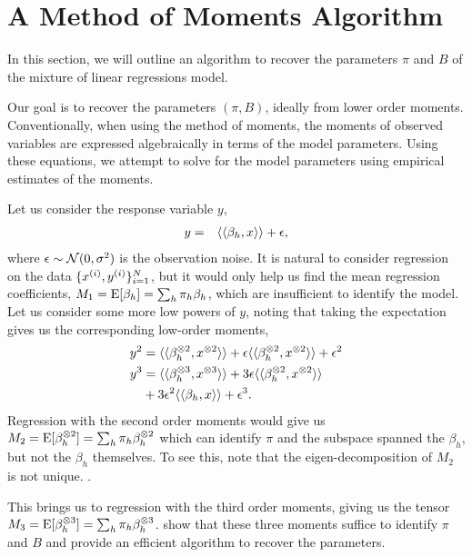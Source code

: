\section{A Method of Moments Algorithm}
\label{sec:algo}

In this section, we will outline an algorithm to recover the parameters
$\pi$ and $B$ of the mixture of linear regressions model. 

Our goal is to recover the parameters $(\pi, B)$, ideally from lower
order moments. Conventionally, when using the method of moments, the
moments of observed variables are expressed algebraically in terms of
the model parameters. Using these equations, we attempt to solve for the
model parameters using empirical estimates of the moments. 

Let us consider the response variable $y$, 
\begin{align}
  y &=& \langle\langle \beta_h, x \rangle\rangle + \epsilon,
\end{align}
where $\epsilon \sim \mathcal{N}(0, \sigma^2)$ is the observation noise.  It
is natural to consider regression on the data $\{x^{(i)},
y^{(i)}\}_{i=1}^{N}$, but it would only help us find the mean regression
coefficients, $M_1 = \operatorname{E}[\beta_h] = \sum_h \pi_h \beta_h$, which are insufficient to
identify the model. Let us consider some more low powers of $y$, noting
that taking the expectation gives us the corresponding low-order
moments,
\begin{align}
  y^2 &= \langle\langle \beta_h^{\otimes 2}, x^{\otimes 2} \rangle\rangle + \epsilon \langle\langle \beta_h^{\otimes 2}, x^{\otimes 2} \rangle\rangle + \epsilon^2 \label{eq:y2} \\ 
  y^3 &= \langle\langle \beta_h^{\otimes 3}, x^{\otimes 3} \rangle\rangle + 3 \epsilon \langle\langle \beta_h^{\otimes 2}, x^{\otimes 2} \rangle\rangle \notag \\
  &+ 3 \epsilon^2 \langle\langle \beta_h, x \rangle\rangle + \epsilon^3. \label{eq:y3} 
\end{align}
Regression with the second order moments would give us $M_2 = \operatorname{E}[\beta_h
^{\otimes 2}] = \sum_h \pi_h \beta_h^{\otimes 2}$ which can identify $\pi$ and the
subspace spanned the $\beta_h$, but not the $\beta_h$ themselves. To see
this, note that the eigen-decomposition of $M_2$ is not unique.
.

This brings us to regression with the third order moments, giving us the
tensor $M_3 = \operatorname{E}[\beta_h ^{\otimes 3}] = \sum_h \pi_h \beta_h^{\otimes 3}$.
\citet{AnandkumarGeHsu} show that these three moments suffice to
identify $\pi$ and $B$ and provide an efficient algorithm to recover the
parameters.

